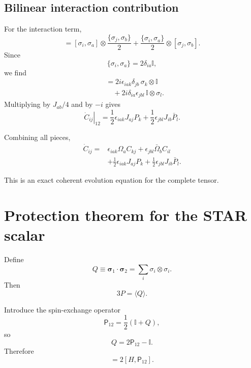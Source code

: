 \documentclass[11pt]{article}
\newcommand{\Id}{\mathbb I}
\newcommand{\eps}{\epsilon}
\begin{document}
\subsection{Bilinear interaction contribution}

For the interaction term,
\begin{equation}
[\sigma_i\otimes\sigma_j,\sigma_a\otimes\sigma_b]
=
[\sigma_i,\sigma_a]\otimes
\frac{\{\sigma_j,\sigma_b\}}2
+
\frac{\{\sigma_i,\sigma_a\}}2
\otimes[\sigma_j,\sigma_b].
\end{equation}
Since
\begin{equation}
\{\sigma_i,\sigma_a\}=2\delta_{ia}\Id,
\end{equation}
we find
\begin{align}
[\sigma_i\otimes\sigma_j,\sigma_a\otimes\sigma_b]
&=
2i\eps_{iak}\delta_{jb}\,
\sigma_k\otimes\Id\\
&\quad+
2i\delta_{ia}\eps_{jbl}\,
\Id\otimes\sigma_l.
\end{align}
Multiplying by $J_{ab}/4$ and by $-i$ gives
\begin{equation}
\left.\dot C_{ij}\right|_{12}
=
\frac12\eps_{iak}J_{aj}P_k
+
\frac12\eps_{jbl}J_{ib}\bar P_l.
\end{equation}

Combining all pieces,
\begin{equation}
\boxed{
\begin{aligned}
\dot C_{ij}
={}&
\eps_{iak}\Omega_aC_{kj}
+
\eps_{jbl}\bar\Omega_bC_{il}\\
&+
\frac12\eps_{iak}J_{aj}P_k
+
\frac12\eps_{jbl}J_{ib}\bar P_l .
\end{aligned}}
\label{eq:fullC}
\end{equation}

This is an exact coherent evolution equation for the complete tensor.

\section{Protection theorem for the STAR scalar}

Define
\begin{equation}
Q
\equiv
\bm\sigma_1\cdot\bm\sigma_2
=
\sum_i\sigma_i\otimes\sigma_i.
\end{equation}
Then
\begin{equation}
3P=\langle Q\rangle.
\end{equation}

Introduce the spin-exchange operator
\begin{equation}
\mathsf P_{12}
=
\frac12(\Id+Q),
\label{eq:swap}
\end{equation}
so
\begin{equation}
Q=2\mathsf P_{12}-\Id.
\end{equation}
Therefore
\begin{equation}
[H,Q]=2[H,\mathsf P_{12}].
\end{equation}
\end{document}
